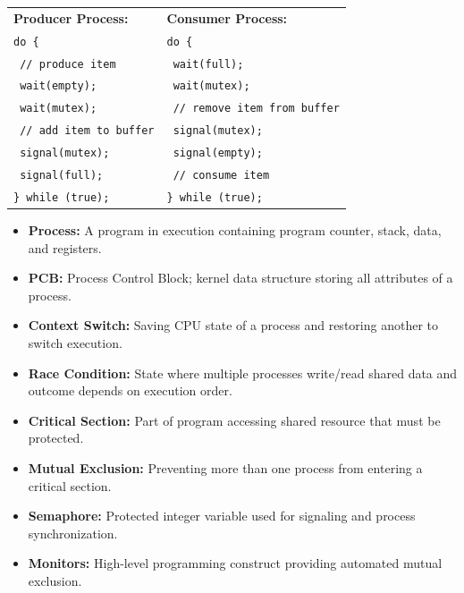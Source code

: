 \documentclass[12pt,a4paper]{article}
\begin{document}
\begin{tcolorbox}[formulabox, title={\textbf{Producer-Consumer Semaphore Code}}]
\begin{tabularx}{\linewidth}{X X}
\textbf{Producer Process:} & \textbf{Consumer Process:} \\
\texttt{do \{} & \texttt{do \{} \\
\texttt{  // produce item} & \texttt{  wait(full);} \\
\texttt{  wait(empty);} & \texttt{  wait(mutex);} \\
\texttt{  wait(mutex);} & \texttt{  // remove item from buffer} \\
\texttt{  // add item to buffer} & \texttt{  signal(mutex);} \\
\texttt{  signal(mutex);} & \texttt{  signal(empty);} \\
\texttt{  signal(full);} & \texttt{  // consume item} \\
\texttt{\} while (true);} & \texttt{\} while (true);}
\end{tabularx}
\end{tcolorbox}

\begin{tcolorbox}[defbox, title={\textbf{One-Line Definitions}}]
\begin{itemize}[leftmargin=*, itemsep=2.5pt, topsep=0pt]
  \item \textbf{Process:} A program in execution containing program counter, stack, data, and registers.
  \item \textbf{PCB:} Process Control Block; kernel data structure storing all attributes of a process.
  \item \textbf{Context Switch:} Saving CPU state of a process and restoring another to switch execution.
  \item \textbf{Race Condition:} State where multiple processes write/read shared data and outcome depends on execution order.
  \item \textbf{Critical Section:} Part of program accessing shared resource that must be protected.
  \item \textbf{Mutual Exclusion:} Preventing more than one process from entering a critical section.
  \item \textbf{Semaphore:} Protected integer variable used for signaling and process synchronization.
  \item \textbf{Monitors:} High-level programming construct providing automated mutual exclusion.
\end{itemize}
\end{tcolorbox}
\end{document}
